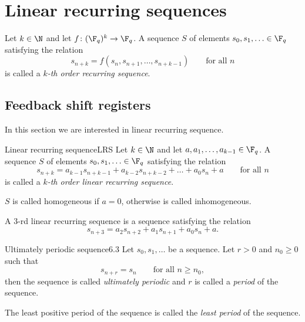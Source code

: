%
%
\chapter{Linear recurring sequences}

Let \(k\in\N\) and let \(f\colon (\F_q)^k \to \F_q\). A sequence \(S\) of elements \(s_0,s_1,\ldots\in\F_q\) satisfying the relation
\[
	s_{n+k} = f(s_n,s_{n+1},\ldots,s_{n+k-1}) \qquad\text{for all }n
\]
is called a \emph{\(k\)-th order recurring sequence}.

\section{Feedback shift registers}

In this section we are interested in linear recurring sequence.

\begin{defn}{Linear recurring sequence}{LRS}
	Let \(k\in\N\) and let \(a,a_1,\ldots,a_{k-1} \in \F_q\). A sequence \(S\) of elements \(s_0,s_1,\ldots\in\F_q\) satisfying the relation
	\[
		s_{n+k} = a_{k-1}s_{n+k-1} + a_{k-2}s_{n+k-2} + \ldots + a_0 s_n + a \qquad\text{for all }n
	\]
	is called a \emph{\(k\)-th order linear recurring sequence}.
\end{defn}

\begin{notz}
	\(S\) is called homogeneous if \(a=0\), otherwise is called inhomogeneous.
\end{notz}

\begin{ese}
	A \(3\)-rd linear recurring sequence is a sequence satisfying the relation
	\[
		s_{n+3} = a_2 s_{n+2} + a_1 s_{n+1} + a_0 s_n + a.
	\]
\end{ese}

\begin{defn}{Ultimately periodic sequence}{6.3}
	Let \(s_0,s_1,\ldots\) be a sequence. Let \(r>0\) and \(n_0\ge 0\) such that
	\[
		s_{n+r} = s_n \qquad\text{for all }n \ge n_0,
	\]
	then the sequence is called \emph{ultimately periodic} and \(r\) is called a \emph{period} of the sequence.
\end{defn}

\begin{notz}
	The least positive period of the sequence is called the \emph{least period} of the sequence.
\end{notz}

